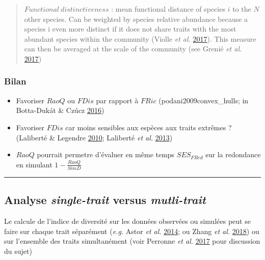 \documentclass[]{article}
\providecommand{\tightlist}{%
  \setlength{\itemsep}{0pt}\setlength{\parskip}{0pt}}
\begin{document}
\begin{quote}
\(Functional~distinctiveness\) : mean functional distance of species
\(i\) to the \(N\) other species. Can be weighted by species relative
abundance because a species i even more distinct if it does not share
traits with the most abundant species within the community (Violle
\emph{et al.}
\protect\hyperlink{ref-violle2017functional_rarity}{2017}). This measure
can then be averaged at the scale of the community (see Grenié \emph{et
al.} \protect\hyperlink{ref-grenie2017funrar}{2017})
\end{quote}

\subsubsection{Bilan}\label{bilan}

\begin{itemize}
\tightlist
\item
  Favoriser \(RaoQ\) ou \(FDis\) par rapport à \(FRic\)
  (podani2009convex\_hulls; in Botta-Dukát \& Czúcz
  \protect\hyperlink{ref-botta_dukat2016}{2016})
\item
  Favoriser \(FDis\) car moins sensibles aux espèces aux traits extrêmes
  ? (Laliberté \& Legendre
  \protect\hyperlink{ref-laliberte2010FDis}{2010}; Laliberté \emph{et
  al.} \protect\hyperlink{ref-laliberte2013}{2013})
\item
  \(RaoQ\) pourrait permetre d'évaluer en même temps \(SES_{FRed}\) sur
  la redondance en simulant \(1 - \frac{RaoQ}{SimD}\)
\end{itemize}

\begin{center}\rule{0.5\linewidth}{\linethickness}\end{center}

\subsection{\texorpdfstring{\textbf{Analyse \emph{single-trait} versus
\emph{mutli-trait}}}{Analyse single-trait versus mutli-trait}}\label{analyse-single-trait-versus-mutli-trait}

Le calcule de l'indice de diversité sur les données observées ou
simulées peut se faire sur chaque trait séparément (\emph{e.g.} Astor
\emph{et al.} \protect\hyperlink{ref-astor2014trait_dispersion}{2014};
ou Zhang \emph{et al.} \protect\hyperlink{ref-zhang2018}{2018}) ou sur
l'ensemble des traits simultanément (voir Perronne \emph{et al.}
\protect\hyperlink{ref-perronne2017}{2017} pour discussion du sujet)
\end{document}
